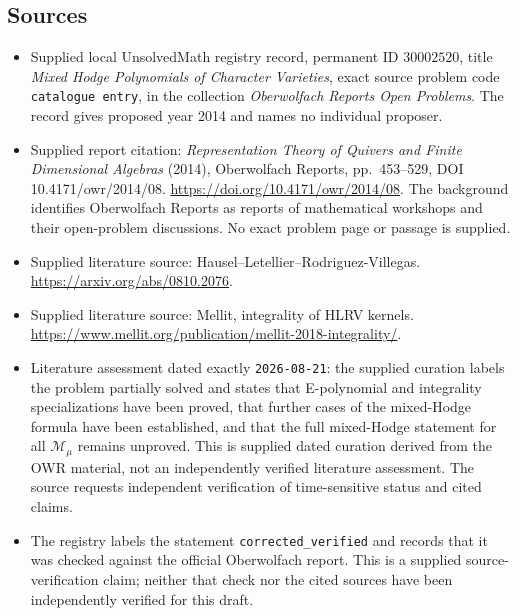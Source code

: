 \documentclass[11pt]{article}
\begin{document}
\subsection{Sources}
\begin{itemize}
\item Supplied local UnsolvedMath registry record, permanent ID \(30002520\), title \emph{Mixed Hodge Polynomials of Character Varieties}, exact source problem code \texttt{catalogue entry}, in the collection \emph{Oberwolfach Reports Open Problems}. The record gives proposed year 2014 and names no individual proposer.
\item Supplied report citation: \emph{Representation Theory of Quivers and Finite Dimensional Algebras} (2014), Oberwolfach Reports, pp.\ 453--529, DOI 10.4171/owr/2014/08. \url{https://doi.org/10.4171/owr/2014/08}. The background identifies Oberwolfach Reports as reports of mathematical workshops and their open-problem discussions. No exact problem page or passage is supplied.
\item Supplied literature source: Hausel--Letellier--Rodriguez-Villegas. \url{https://arxiv.org/abs/0810.2076}.
\item Supplied literature source: Mellit, integrality of HLRV kernels. \url{https://www.mellit.org/publication/mellit-2018-integrality/}.
\item Literature assessment dated exactly \texttt{2026-08-21}: the supplied curation labels the problem partially solved and states that E-polynomial and integrality specializations have been proved, that further cases of the mixed-Hodge formula have been established, and that the full mixed-Hodge statement for all \(\mathcal M_\mu\) remains unproved. This is supplied dated curation derived from the OWR material, not an independently verified literature assessment. The source requests independent verification of time-sensitive status and cited claims.
\item The registry labels the statement \texttt{corrected\_verified} and records that it was checked against the official Oberwolfach report. This is a supplied source-verification claim; neither that check nor the cited sources have been independently verified for this draft.
\end{itemize}
\end{document}
